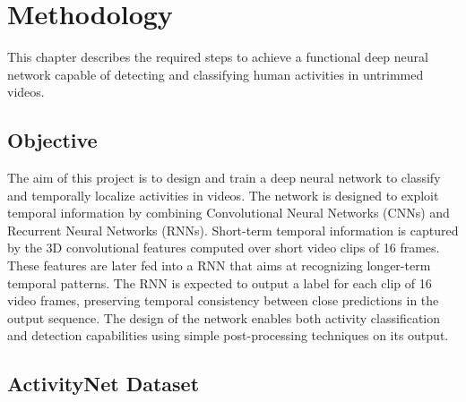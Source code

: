 \chapter{Methodology}

This chapter describes the required steps to achieve a functional deep neural network capable of detecting and classifying human activities in untrimmed videos. %


\section{Objective}

The aim of this project is to design and train a deep neural network to classify and temporally localize activities in videos. The network is designed to exploit temporal information by combining Convolutional Neural Networks (CNNs) and Recurrent Neural Networks (RNNs). Short-term temporal information is captured by the 3D convolutional features computed over short video clips of 16 frames.
These features are later fed into a RNN that aims at recognizing longer-term temporal patterns. The RNN is expected to output a label for each clip of 16 video frames, preserving temporal consistency between close predictions in the output sequence. The design of the network enables both activity classification and detection capabilities using simple post-processing techniques on its output.



\section{ActivityNet Dataset}

